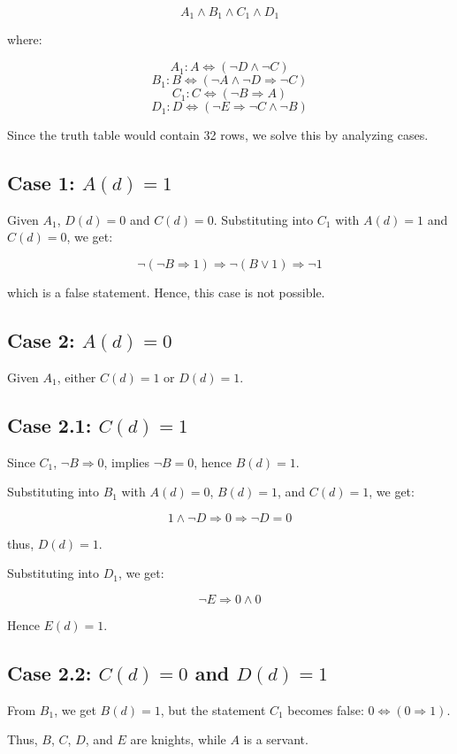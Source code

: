 \documentclass[11pt,paper=b5,footinclude,headinclude]{scrbook} %
\theoremstyle{remark}
\theoremstyle{definition} %
\theoremstyle{theorem} %
\begin{document}
\begin{enumerate}[Problem 1.]
\[
A_1 \land B_1 \land C_1 \land D_1
\]

where:

\[
A_1 : A \iff (\neg D \land \neg C)
\]
\[
B_1 : B \iff (\neg A \land \neg D \Rightarrow \neg C)
\]
\[
C_1 : C \iff (\neg B \Rightarrow A)
\]
\[
D_1 : D \iff (\neg E \Rightarrow \neg C \land \neg B)
\]

Since the truth table would contain 32 rows, we solve this by analyzing cases.

\subsection*{Case 1: \( A(d) = 1 \)}

Given \( A_1 \), \( D(d) = 0 \) and \( C(d) = 0 \). Substituting into \( C_1 \) with \( A(d) = 1 \) and \( C(d) = 0 \), we get:

\[
\neg (\neg B \Rightarrow 1) \Rightarrow \neg(B \lor 1) \Rightarrow \neg 1
\]

which is a false statement. Hence, this case is not possible.

\subsection*{Case 2: \( A(d) = 0 \)}

Given \( A_1 \), either \( C(d) = 1 \) or \( D(d) = 1 \).

\subsection*{Case 2.1: \( C(d) = 1 \)}

Since \( C_1 \), \( \neg B \Rightarrow 0 \), implies \( \neg B = 0 \), hence \( B(d) = 1 \).

Substituting into \( B_1 \) with \( A(d) = 0 \), \( B(d) = 1 \), and \( C(d) = 1 \), we get:

\[
1 \land \neg D \Rightarrow 0 \Rightarrow \neg D = 0
\]

thus, \( D(d) = 1 \).

Substituting into \( D_1 \), we get:

\[
\neg E \Rightarrow 0 \land 0
\]

Hence \( E(d) = 1 \).

\subsection*{Case 2.2: \( C(d) = 0 \) and \( D(d) = 1 \)}

From \( B_1 \), we get \( B(d) = 1 \), but the statement \( C_1 \) becomes false: \( 0 \iff (0 \Rightarrow 1) \).

Thus, \( B \), \( C \), \( D \), and \( E \) are knights, while \( A \) is a servant.


\end{enumerate}
\end{document}
